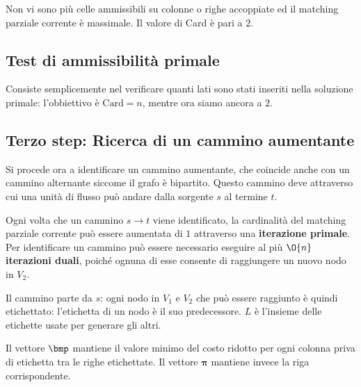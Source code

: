 \documentclass[\main/main.tex]{subfiles}
\begin{document}
Non vi sono più celle ammissibili su colonne o righe accoppiate ed il matching parziale corrente è massimale. Il valore di Card è pari a \(2\).

\subsection{Test di ammissibilità primale}
Consiste semplicemente nel verificare quanti lati sono stati inseriti nella soluzione primale: l'obbiettivo è \(\text{Card} = n\), mentre ora siamo ancora a \(2\).
\clearpage
\subsection{Terzo step: Ricerca di un cammino aumentante}
Si procede ora a identificare un cammino aumentante, che coincide anche con un cammino alternante siccome il grafo è bipartito. Questo cammino deve attraverso cui una unità di flusso può andare dalla sorgente \(s\) al termine \(t\).

Ogni volta che un cammino \(s\rightarrow t\) viene identificato, la cardinalità del matching parziale corrente può essere aumentata di \(1\) attraverso una \textbf{iterazione primale}. Per identificare un cammino può essere necessario eseguire al più \(\O{n}\) \textbf{iterazioni duali}, poiché ognuna di esse consente di raggiungere un nuovo nodo in \(V_2\).

Il cammino parte da \(s\): ogni nodo in \(V_1\) e \(V_2\) che può essere raggiunto è quindi etichettato: l'etichetta di un nodo è il suo predecessore. \(L\) è l'insieme delle etichette usate per generare gli altri.

Il vettore \(\bmp \) mantiene il valore minimo del costo ridotto per ogni colonna priva di etichetta tra le righe etichettate. Il vettore \(\bm{\pi} \) mantiene invece la riga corrispondente.
\end{document}
